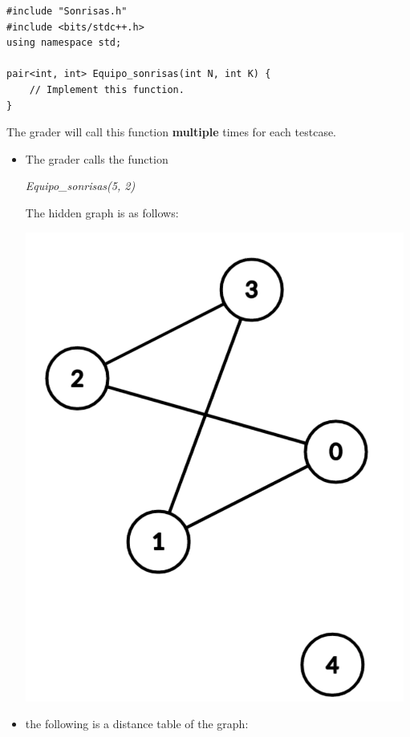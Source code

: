 \documentclass[12pt]{scrartcl}
\begin{document}
\begin{verbatim}
#include "Sonrisas.h"
#include <bits/stdc++.h>
using namespace std;

pair<int, int> Equipo_sonrisas(int N, int K) {
    // Implement this function.
}

\end{verbatim}

    The grader will call this function \textbf{multiple} times for each testcase.
    

        \begin{itemize}
            \item The grader calls the function 
            \begin{center}
                \textit{Equipo\_sonrisas(5, 2)}
            \end{center}
            The hidden graph is as follows:
            \begin{center}
                \includegraphics[scale=0.3]{ej1.png}
            \end{center}
            \item the following is a distance table of the graph:
            

\end{itemize}
\end{document}
